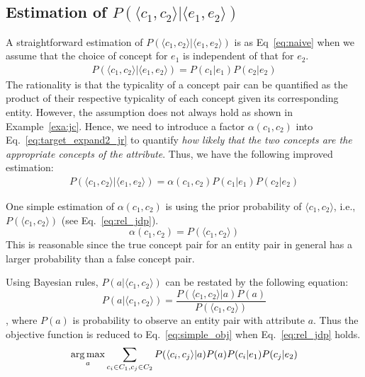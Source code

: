 \subsection{Estimation of $P(\langle c_1,c_2\rangle | \langle e_1,e_2\rangle)$ }
A straightforward estimation of $P( \langle c_{1},c_{2} \rangle | \langle e_{1},e_{2} \rangle )$ is as Eq~\ref{eq:naive} when we assume that the choice of concept for $e_1$ is independent of that for $e_2$.
\begin{equation}
\label{eq:naive}
\begin{split}
P(\langle c_{1},c_{2}\rangle |\langle e_{1},e_{2} \rangle) = P(c_1|e_1) P(c_2|e_2)
\end{split}
\end{equation} The rationality is that the typicality of a concept pair can be quantified as the product of their respective typicality of each concept given its corresponding entity.
However, the assumption does not always hold as shown in Example~\ref{exa:jc}. Hence, we need to introduce a factor $\alpha(c_1,c_2)$ into Eq.~\ref{eq:target_expand2_jr} to quantify {\it how likely that the two concepts are the appropriate concepts of the attribute}. Thus, we have the following improved estimation:
\begin{equation}
\label{eq:target_expand2_jr}
\begin{split}
P(\langle c_{1},c_{2}\rangle |\langle e_{1},e_{2} \rangle) = \alpha(c_1,c_2)  P(c_1|e_1)  P(c_2|e_2)
\end{split}
\end{equation}


One simple estimation of $\alpha(c_1,c_2)$ is using the prior probability of $\langle c_1, c_2\rangle$, i.e., $P(\langle c_1,c_2\rangle)$ (see Eq.~\ref{eq:rel_jdp}).
\begin{equation}\label{eq:rel_jdp}
  \alpha(c_1,c_2) = P(\langle c_1, c_2\rangle)
\end{equation}
This is reasonable since the true concept pair for an entity pair in general has a larger probability than
a false concept pair.

Using Bayesian rules, $P(a| \langle c_{1},c_{2} \rangle )$ can be restated by the following equation:
\begin{equation}
\label{eq:target_expand1}
P(a|\langle c_{1},c_{2} \rangle)= \frac{ P(\langle c_{1},c_{2}\rangle|a)P(a) }{ P(\langle c_{1},c_{2}\rangle) }
\end{equation},
where $P(a)$ is probability to observe an entity pair with attribute $a$.
Thus the objective function is reduced to Eq.~\ref{eq:simple_obj} when Eq.~\ref{eq:rel_jdp} holds.
\begin{equation}
\label{eq:simple_obj}
 \operatorname*{arg\,max}_a \sum_{c_i\in C_1, c_j\in C_2} P(\langle c_{i},c_{j}\rangle |a) P(a) P(c_i|e_1) P(c_j|e_2)
\end{equation}




